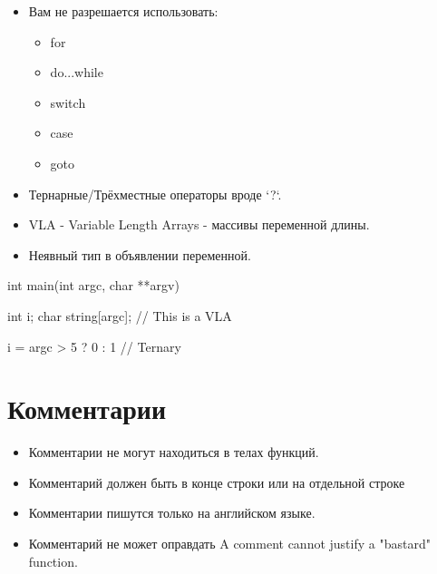 \documentclass{42-ru}
\begin{document}
        \begin{itemize}

            \item Вам не разрешается использовать:

                \begin{itemize}

                    \item for
                    \item do...while
                    \item switch
                    \item case
                    \item goto

                \end{itemize}

            \item Тернарные/Трёхместные операторы вроде `?`.

            \item VLA - Variable Length Arrays - массивы переменной длины.

            \item Неявный тип в объявлении переменной.

        \end{itemize}
        \begin{42ccode}
    int main(int argc, char **argv)
    {
        int     i;
        char    string[argc]; // This is a VLA

        i = argc > 5 ? 0 : 1 // Ternary
    }
        \end{42ccode}
        \newpage

    \section{Комментарии}

        \begin{itemize}

            \item Комментарии не могут находиться в телах функций.

            \item Комментарий должен быть в конце строки или на отдельной строке

            \item Комментарии пишутся только на английском языке.

            \item Комментарий не может оправдать A comment cannot justify a "bastard" function.

        \end{itemize}
        \newpage
\end{document}
